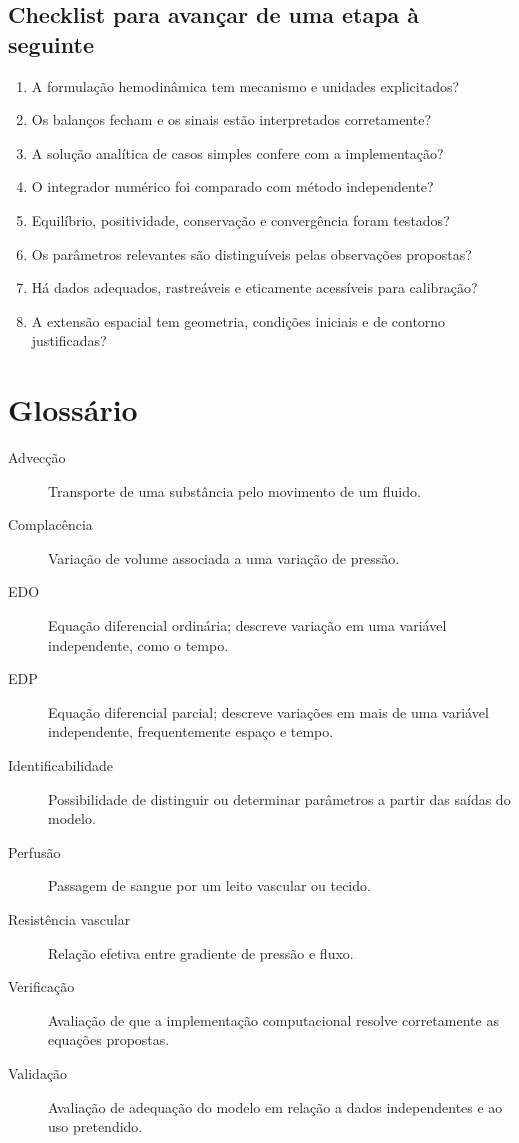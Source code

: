 \documentclass[11pt,a4paper,oneside]{book}
\begin{document}
\section{Checklist para avançar de uma etapa à seguinte}
\begin{enumerate}
  \item A formulação hemodinâmica tem mecanismo e unidades explicitados?
  \item Os balanços fecham e os sinais estão interpretados corretamente?
  \item A solução analítica de casos simples confere com a implementação?
  \item O integrador numérico foi comparado com método independente?
  \item Equilíbrio, positividade, conservação e convergência foram testados?
  \item Os parâmetros relevantes são distinguíveis pelas observações propostas?
  \item Há dados adequados, rastreáveis e eticamente acessíveis para calibração?
  \item A extensão espacial tem geometria, condições iniciais e de contorno justificadas?
\end{enumerate}

\chapter*{Glossário}
\begin{description}
  \item[Advecção] Transporte de uma substância pelo movimento de um fluido.
  \item[Complacência] Variação de volume associada a uma variação de pressão.
  \item[EDO] Equação diferencial ordinária; descreve variação em uma variável independente, como o tempo.
  \item[EDP] Equação diferencial parcial; descreve variações em mais de uma variável independente, frequentemente espaço e tempo.
  \item[Identificabilidade] Possibilidade de distinguir ou determinar parâmetros a partir das saídas do modelo.
  \item[Perfusão] Passagem de sangue por um leito vascular ou tecido.
  \item[Resistência vascular] Relação efetiva entre gradiente de pressão e fluxo.
  \item[Verificação] Avaliação de que a implementação computacional resolve corretamente as equações propostas.
  \item[Validação] Avaliação de adequação do modelo em relação a dados independentes e ao uso pretendido.
\end{description}
\end{document}
